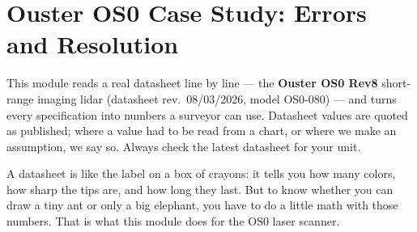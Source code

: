 \chapter{Ouster OS0 Case Study: Errors and Resolution}

This module reads a real datasheet line by line --- the \textbf{Ouster OS0 Rev8} short-range imaging lidar (datasheet rev.\ 08/03/2026, model OS0-080) --- and turns every specification into numbers a surveyor can use. Datasheet values are quoted as published; where a value had to be read from a chart, or where we make an assumption, we say so. Always check the latest datasheet for your unit.

\begin{kid}
A datasheet is like the label on a box of crayons: it tells you how many colors, how sharp the tips are, and how long they last. But to know whether you can draw a tiny ant or only a big elephant, you have to do a little math with those numbers. That is what this module does for the OS0 laser scanner.
\end{kid}

